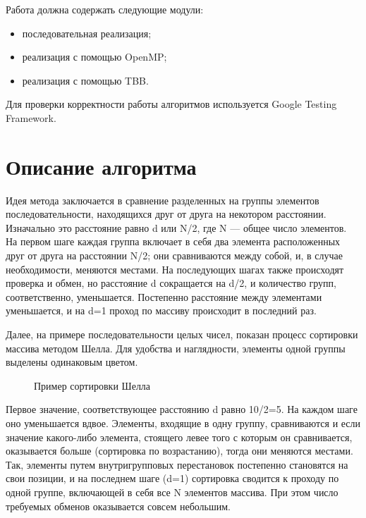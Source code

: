 \documentclass{report}
\begin{document}
Работа должна содержать следующие модули:
\begin{itemize}
  \item последовательная реализация;
  \item реализация с помощью OpenMP;
  \item реализация с помощью TBB.
\end{itemize}

Для проверки корректности работы алгоритмов используется Google Testing Framework.
\newpage

\section*{Описание алгоритма}
Идея метода заключается в сравнение разделенных на группы элементов последовательности, находящихся друг от друга на некотором расстоянии. Изначально это расстояние равно d или N/2, где N — общее число элементов. На первом шаге каждая группа включает в себя два элемента расположенных друг от друга на расстоянии N/2; они сравниваются между собой, и, в случае необходимости, меняются местами. На последующих шагах также происходят проверка и обмен, но расстояние d сокращается на d/2, и количество групп, соответственно, уменьшается. Постепенно расстояние между элементами уменьшается, и на d=1 проход по массиву происходит в последний раз.

Далее, на примере последовательности целых чисел, показан процесс сортировки массива методом Шелла. Для удобства и наглядности, элементы одной группы выделены одинаковым цветом.
\begin{figure}[h]
\caption{Пример сортировки Шелла}
\end{figure}

Первое значение, соответствующее расстоянию d равно 10/2=5. На каждом шаге оно уменьшается вдвое. Элементы, входящие в одну группу, сравниваются и если значение какого-либо элемента, стоящего левее того с которым он сравнивается, оказывается больше (сортировка по возрастанию), тогда они меняются местами. Так, элементы путем внутригрупповых перестановок постепенно становятся на свои позиции, и на последнем шаге (d=1) сортировка сводится к проходу по одной группе, включающей в себя все N элементов массива. При этом число требуемых обменов оказывается совсем небольшим.
\end{document}
